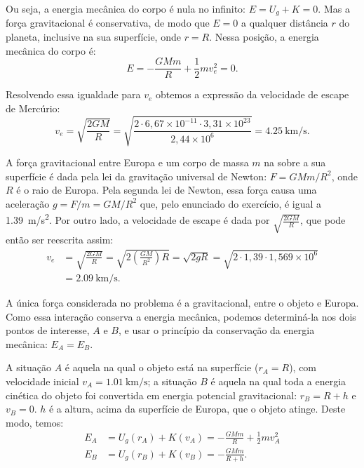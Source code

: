 \documentclass[a4paper]{article}
\begin{document}
\begin{resolucoes}
\begin{exercicio}
  Ou seja, a energia mecânica do corpo é nula no infinito: $E = U_g + K = 0$.
  Mas a força gravitacional é conservativa, de modo que $E = 0$ a qualquer distância $r$ do planeta, inclusive na sua superfície, onde $r = R$.
  Nessa posição, a energia mecânica do corpo é:
  \begin{equation*}
  E = -\frac{GMm}{R} + \frac{1}{2}mv_e^2 = 0.
  \end{equation*}
  
  Resolvendo essa igualdade para $v_e$ obtemos a expressão da velocidade de escape de Mercúrio:
  \begin{equation*}
  v_e = \sqrt{\frac{2GM}{R}} = \sqrt{\frac{ 2 \cdot 6,67\times10^{-11} \cdot 3,31\times10^{23} }{2,44 \times10^{6}}} = \SI{4.25}{\kilo\metre\per\second}.
  \end{equation*}
  \end{exercicio}
  
  \begin{exercicio}
  
  \begin{compactenum}[(a)]
  \item A força gravitacional entre Europa e um corpo de massa $m$ na sobre a sua superfície é dada pela lei da gravitação universal de Newton: $F = GMm/R^2$, onde $R$ é o raio de Europa.
  Pela segunda lei de Newton, essa força causa uma aceleração $g = F/m = GM/R^2$ que, pelo enunciado do exercício, é igual a \SI{1.39}{m/s^2}.
  Por outro lado, a velocidade de escape é dada por $\sqrt{\frac{2GM}{R}}$, que pode então ser reescrita assim:
  \begin{align*}
  v_e &= \sqrt{\frac{2GM}{R}} = \sqrt{2\left(\frac{GM}{R^2}\right)R} = \sqrt{2gR} = \sqrt{2\cdot1,39\cdot 1,569\times10^6}\\
      &= \SI{2.09}{\kilo\metre\per\second}.
  \end{align*}
  
  \item A única força considerada no problema é a gravitacional, entre o objeto e Europa.
  Como essa interação conserva a energia mecânica, podemos determiná-la nos dois pontos de interesse, $A$ e $B$, e usar o princípio da conservação da energia mecânica: $E_A = E_B$.

  A situação $A$ é aquela na qual o objeto está na superfície ($r_A = R$), com velocidade inicial $v_A = \SI{1.01}{\kilo\metre\per\second}$;
  a situação $B$ é aquela na qual toda a energia cinética do objeto foi convertida em energia potencial gravitacional: $r_B = R + h$ e $v_B = 0$.
  $h$ é a altura, acima da superfície de Europa, que o objeto atinge.
  Deste modo, temos:
  \begin{align*}
  E_A &= U_g(r_A) + K(v_A) = -\frac{GMm}{R} + \frac{1}{2}mv_A^2 \\
  E_B &= U_g(r_B) + K(v_B) = -\frac{GMm}{R+h}.
  \end{align*}
  

\end{compactenum}
\end{exercicio}
\end{resolucoes}
\end{document}
